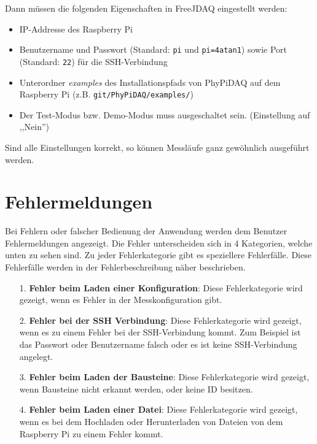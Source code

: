 \documentclass[parskip=full]{scrartcl}
\begin{document}
Dann müssen die folgenden Eigenschaften in FreeJDAQ eingestellt werden:

\begin{itemize}

\item IP-Addresse des Raspberry Pi
\item Benutzername und Passwort (Standard: \verb:pi: und \verb:pi=4atan1:) sowie Port (Standard: \verb:22:) für die SSH-Verbindung
\item Unterordner \textit{examples} des Installationspfads von PhyPiDAQ auf dem Raspberry Pi (z.B. \verb:git/PhyPiDAQ/examples/:)
\item Der  Test-Modus bzw. Demo-Modus muss ausgeschaltet sein. (Einstellung auf ,,Nein'')

\end{itemize}

Sind alle Einstellungen korrekt, so können Messläufe ganz gewöhnlich ausgeführt werden.

\section{Fehlermeldungen}

Bei Fehlern oder falscher Bedienung der Anwendung werden dem Benutzer Fehlermeldungen angezeigt. Die Fehler unterscheiden sich in 4 Kategorien, welche unten zu sehen sind. Zu jeder Fehlerkategorie gibt es speziellere Fehlerfälle. Diese Fehlerfälle werden in der Fehlerbeschreibung näher beschrieben.

\begin{itemize}


\item[1.] \textbf{Fehler beim Laden einer Konfiguration}: Diese Fehlerkategorie wird gezeigt, wenn es Fehler in der Messkonfiguration gibt.

\item[2.] \textbf{Fehler bei der SSH Verbindung}: Diese Fehlerkategorie wird gezeigt, wenn es zu einem Fehler bei der SSH-Verbindung kommt. Zum Beispiel ist das Passwort oder Benutzername falsch oder es ist keine SSH-Verbindung angelegt.

\item[3.] \textbf{Fehler beim Laden der Bausteine}: Diese Fehlerkategorie wird gezeigt, wenn Bausteine nicht erkannt werden, oder keine ID besitzen.

\item[4.] \textbf{Fehler beim Laden einer Datei}: Diese Fehlerkategorie wird gezeigt, wenn es bei dem Hochladen oder Herunterladen von Dateien von dem Raspberry Pi zu einem Fehler kommt.

\end{itemize}
\end{document}
